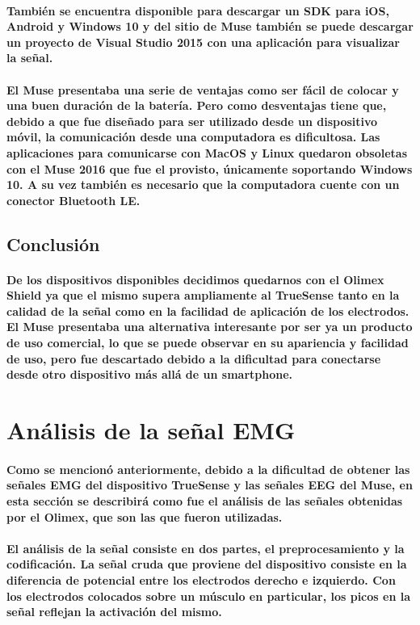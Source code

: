 \documentclass{article}
\begin{document}
\paragraph{
También se encuentra disponible para descargar un SDK para iOS, Android y Windows 10 y del sitio de Muse también se puede descargar un proyecto de Visual Studio 2015 con una aplicación para visualizar la señal.
}
\paragraph{
El Muse presentaba una serie de ventajas como ser fácil de colocar y una buen duración de la batería. Pero como desventajas tiene que, debido a que fue diseñado para ser utilizado desde un dispositivo móvil, la comunicación desde una computadora es dificultosa. Las aplicaciones para comunicarse con MacOS y Linux quedaron obsoletas con el Muse 2016 que fue el provisto, únicamente soportando Windows 10. A su vez también es necesario que la computadora cuente con un conector Bluetooth LE.
}

\subsection{Conclusión}
\paragraph{
De los dispositivos disponibles decidimos quedarnos con el Olimex Shield ya que el mismo supera ampliamente al TrueSense tanto en la calidad de la señal como en la facilidad de aplicación de los electrodos. El Muse presentaba una alternativa interesante por ser ya un producto de uso comercial, lo que se puede observar en su apariencia y facilidad de uso, pero fue descartado debido a la dificultad para conectarse desde otro dispositivo más allá de un smartphone.
}

\section{Análisis de la señal EMG}
\paragraph{
Como se mencionó anteriormente, debido a la dificultad de obtener las señales EMG del dispositivo TrueSense y las señales EEG del Muse, en esta sección se describirá como fue el análisis de las señales obtenidas por el Olimex, que son las que fueron utilizadas.
}
\paragraph{
El análisis de la señal consiste en dos partes, el preprocesamiento y la codificación. La señal cruda que proviene del dispositivo consiste en la diferencia de potencial entre los electrodos derecho e izquierdo. Con los electrodos colocados sobre un músculo en particular, los picos en la señal reflejan la activación del mismo.
}
\end{document}
